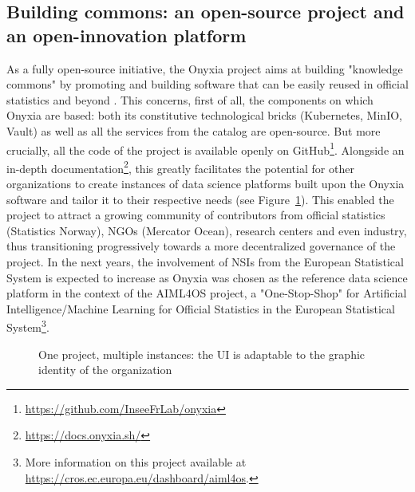 \documentclass[graybox]{svmult}
\begin{document}
\subsection{Building commons: an open-source project and an open-innovation platform}

As a fully open-source initiative, the Onyxia project aims at building "knowledge commons" by promoting and building software that can be easily reused in official statistics and beyond \citep{schweik2006free}. This concerns, first of all, the components on which Onyxia are based: both its constitutive technological bricks (Kubernetes, MinIO, Vault) as well as all the services from the catalog are open-source. But more crucially, all the code of the project is available openly on GitHub\footnote{\url{https://github.com/InseeFrLab/onyxia}}. Alongside an in-depth documentation\footnote{\url{https://docs.onyxia.sh/}}, this greatly facilitates the potential for other organizations to create instances of data science platforms built upon the Onyxia software and tailor it to their respective needs (see Figure~\ref{fig:onyxia-instances}). This enabled the project to attract a growing community of contributors from official statistics (Statistics Norway), NGOs (Mercator Ocean), research centers and even industry, thus transitioning progressively towards a more decentralized governance of the project. In the next years, the involvement of NSIs from the European Statistical System is expected to increase as Onyxia was chosen as the reference data science platform in the context of the AIML4OS project, a "One-Stop-Shop" for Artificial Intelligence/Machine Learning for Official Statistics in the European Statistical System\footnote{More information on this project available at \url{https://cros.ec.europa.eu/dashboard/aiml4os}.}.

\begin{figure}[htbp]
    \centering
    \caption{One project, multiple instances: the UI is adaptable to the graphic identity of the organization}
    \label{fig:onyxia-instances}
\end{figure}
\end{document}
